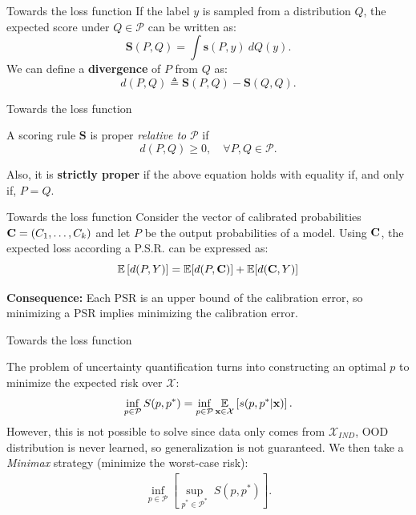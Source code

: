 \documentclass[xcolor=table]{beamer}
\begin{document}
\begin{frame}{Towards the loss function}
If the label \(y\) is sampled from a distribution \(Q\), the expected score under \(Q \in \mathcal P\) can be written as:
\[
\mathbf S (P,Q) = \int \mathbf s (P,y)\ d Q(y).
\]
\pause
We can define a \textbf{divergence} of \(P\) from \(Q\) as:
\[
d(P,Q) \triangleq \mathbf{S}(P,Q) - \mathbf{S}(Q,Q).
\]
    
\end{frame}

\begin{frame}{Towards the loss function}
    \begin{definition}
        A scoring rule \(\mathbf S\) is proper \emph{relative to} \(\mathcal P\) if
        \[
        d(P,Q ) \geq 0, \quad \forall P,Q \in \mathcal P.
        \]
    \end{definition}
    Also, it is \textbf{strictly proper} \citep{2007:SPR} if the above equation holds with equality if, and only if, \(P = Q\).
\end{frame}


\begin{frame}{Towards the loss function}
    Consider the vector of calibrated probabilities \({\mathbf C} = (C_1,\dots,C_k)\) and let \(P\) be the output probabilities of a model. Using \({\mathbf C}\),  the expected loss according a P.S.R. can be expressed \citep{kull2015novel} as:
    \[
    \mathbb{E}\left[d(P,Y)\right] = \mathbb{E}[d(P,{\mathbf C})] + \mathbb E [ d({\mathbf C},Y)]
    \]

    \textbf{Consequence:} Each PSR is an upper bound of the calibration error, so minimizing a PSR implies minimizing the calibration error.
\end{frame}


\begin{frame}{Towards the loss function}
    
    The problem of uncertainty quantification turns into constructing an optimal \(p\) to minimize the expected risk over \(\mathcal X\):
    \begin{align}
    \inf_{p \in \mathcal P} S(p, p^*) = 
    \inf_{p \in \mathcal P} \underset{{\mathbf x} \in \mathcal X}{\mathbb E}
    \left[s(p, p^*|{\mathbf x}) \right].
    \label{eq:brier_risk}
    \end{align}
    \pause
    However, this is not possible to solve since data only comes from \(\mathcal X_{IND}\), OOD distribution is never learned, so generalization is not guaranteed. We then take a \emph{Minimax} strategy (minimize the worst-case risk):
    \pause
    \begin{align}
\inf_{p \in \mathcal P} \left[ \sup_{p^* \in \mathcal P^*} \; S(p, p^*) \right].
\label{eq:minimax_loss}
\end{align}
\end{frame}
\end{document}
